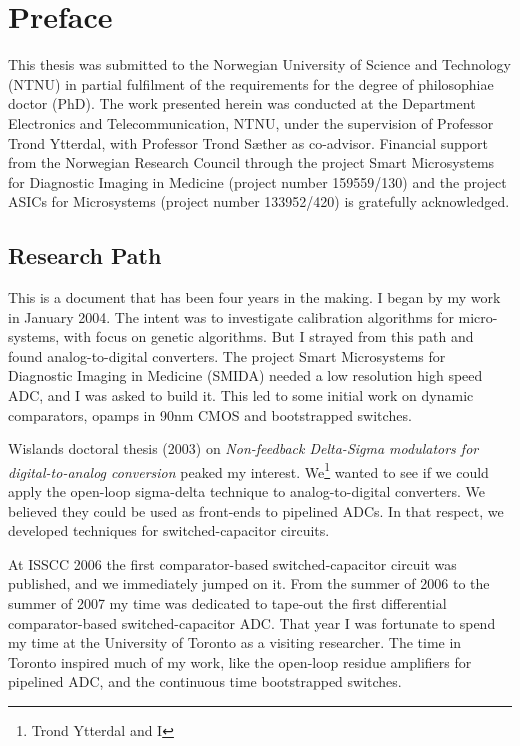 
\chapter*{Preface}
This thesis was submitted to the Norwegian University of Science and Technology 
(NTNU) in partial fulfilment of the requirements for the degree of philosophiae 
doctor (PhD). 
The work presented herein was conducted at the Department Electronics
and Telecommunication, NTNU, under the supervision of Professor Trond
Ytterdal, with Professor Trond S{\ae}ther as co-advisor. Financial support from the Norwegian Research Council through the
project Smart Microsystems for Diagnostic Imaging in Medicine (project
number 159559/130) and the project ASICs for Microsystems (project
number 133952/420) is gratefully acknowledged.


\section*{Research Path}
This is a document that has been four years in the making. I began by
my  work in January 2004. The intent was to investigate calibration
algorithms for micro-systems, with focus on genetic algorithms. But I
strayed from this path and found analog-to-digital converters. The project
Smart Microsystems for Diagnostic Imaging in Medicine (SMIDA) needed a
low resolution high speed ADC, and I was asked to build it. This led to some initial work on dynamic comparators, opamps in
90nm CMOS and bootstrapped switches. 

Wislands doctoral thesis (2003) on \textit{Non-feedback Delta-Sigma
  modulators for digital-to-analog conversion} peaked my
interest. We\footnote{ Trond Ytterdal and I}
wanted to see if we could apply the open-loop sigma-delta technique to
analog-to-digital converters. We believed they could be used as
front-ends to pipelined ADCs. In that respect, we developed techniques
for switched-capacitor circuits. 

At ISSCC 2006 the first comparator-based switched-capacitor circuit
was published, and we immediately jumped on it. From the summer of 2006
to the summer of 2007 my time was dedicated to tape-out the first
differential comparator-based switched-capacitor ADC. That year
I was fortunate to spend my time at the
University of Toronto as a visiting researcher.  The time in Toronto inspired much
of my work, like the open-loop residue amplifiers for pipelined ADC,
and the continuous time bootstrapped switches. 

